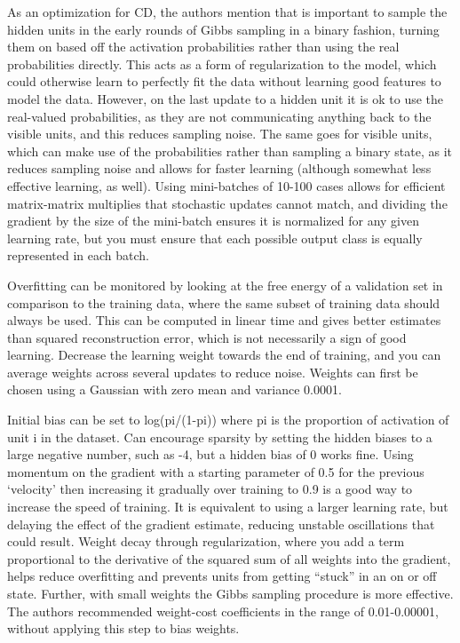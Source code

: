\documentclass[12pt]{article}  %
\begin{document}
As an optimization for CD, the authors mention that is important to sample the hidden units in the early rounds of Gibbs sampling in a binary fashion, turning them on based off the activation probabilities rather than using the real probabilities directly.  This acts as a form of regularization to the model, which could otherwise learn to perfectly fit the data without learning good features to model the data.  However, on the last update to a hidden unit it is ok to use the real-valued probabilities, as they are not communicating anything back to the visible units, and this reduces sampling noise.  The same goes for visible units, which can make use of the probabilities rather than sampling a binary state, as it reduces sampling noise and allows for faster learning (although somewhat less effective learning, as well).  Using mini-batches of 10-100 cases allows for efficient matrix-matrix multiplies that stochastic updates cannot match, and dividing the gradient by the size of the mini-batch ensures it is normalized for any given learning rate, but you must ensure that each possible output class is equally represented in each batch.            
				
Overfitting can be monitored by looking at the free energy of a validation set in comparison to the training data, where the same subset of training data should always be used.  This can be computed in linear time and gives better estimates than squared reconstruction error, which is not necessarily a sign of good learning.  Decrease the learning weight towards the end of training, and you can average weights across several updates to reduce noise.  Weights can first be chosen using a Gaussian with zero mean and variance 0.0001.          
			
Initial bias can be set to log(pi/(1-pi)) where pi is the proportion of activation of unit i in the dataset.  Can encourage sparsity by setting the hidden biases to a large negative number, such as -4, but a hidden bias of 0 works fine.  Using momentum on the gradient with a starting parameter of 0.5 for the previous `velocity' then increasing it gradually over training to 0.9 is a good way to increase the speed of training.  It is equivalent to using a larger learning rate, but delaying the effect of the gradient estimate, reducing unstable oscillations that could result.  Weight decay through regularization, where you add a term proportional to the derivative of the squared sum of all weights into the gradient, helps reduce overfitting and prevents units from getting ``stuck” in an on or off state.  Further, with small weights the Gibbs sampling procedure is more effective.  The authors recommended weight-cost coefficients in the range of 0.01-0.00001, without applying this step to bias weights.  
\end{document}
